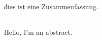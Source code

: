 \renewenvironment{abstract}
{\vspace*{\fill}
  {\bfseries\abstractname}\\[5mm]}
{\vfill}

\begin{abstract}
  dies ist eine Zusammenfassung.
\end{abstract}

\begin{abstract}
  Hello, I'm an abstract.
\end{abstract}
